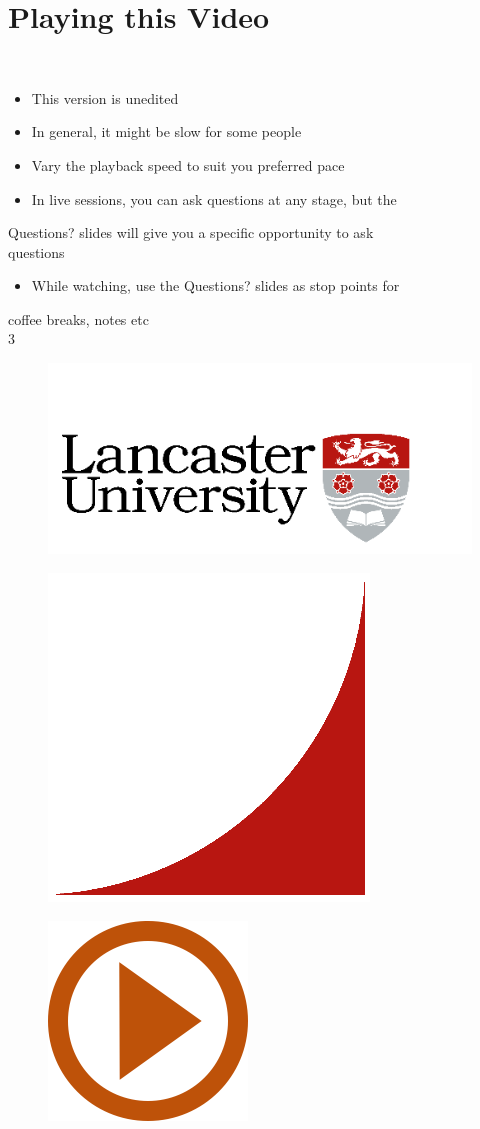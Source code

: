 \documentclass[12pt]{article}
\begin{document}
\section{Playing this Video}
\\
\begin{itemize}
  \item This version is unedited
  \item In general, it might be slow for some people
  \item Vary the playback speed to suit you preferred pace
  \item In live sessions, you can ask questions at any stage, but the 
\end{itemize}
Questions? slides will give you a specific opportunity to ask \\
questions\\
\begin{itemize}
  \item While watching, use the Questions? slides as stop points for 
\end{itemize}
coffee breaks, notes etc\\
3\\
\begin{figure}[H]
\includegraphics[width=0.5\linewidth]{page3-image-1.png}
\end{figure}
\begin{figure}[H]
\includegraphics[width=0.5\linewidth]{page3-image-2.png}
\end{figure}
\begin{figure}[H]
\includegraphics[width=0.5\linewidth]{page3-image-3.png}
\end{figure}
\end{document}
